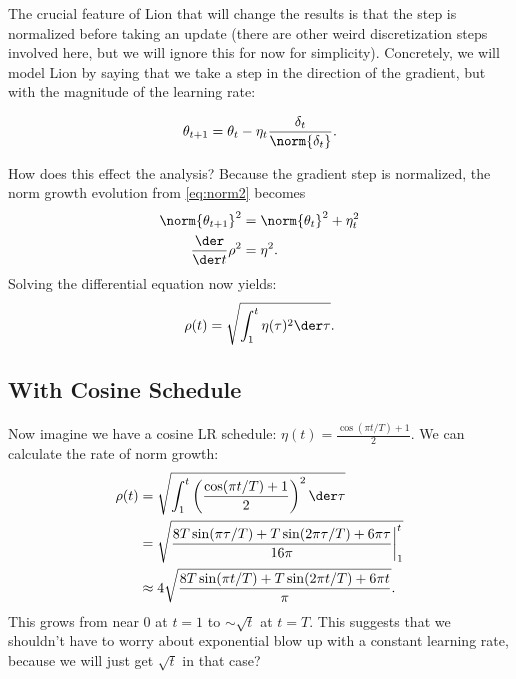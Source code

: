 \documentclass{article}
\newcommand{\note}[4][]{\todo[author=#2,color=#3,size=\scriptsize,fancyline,caption={},#1]{#4}} %
\newcommand{\wm}[2][]{\note[#1]{Will M}{blue!40}{#2}}
\begin{document}

The crucial feature of Lion that will change the results is that the step is normalized before taking an update (there are other weird discretization steps involved here, but we will ignore this for now for simplicity). Concretely, we will model Lion by saying that we take a step in the direction of the gradient, but with the magnitude of the learning rate:

\begin{equation*}
    \theta_{t+1} = \theta_t - \eta_t \frac{\delta_t}{\norm{\delta_t}} .
\end{equation*}

How does this effect the analysis? Because the gradient step is normalized, the norm growth evolution from \eqref{eq:norm2} becomes
\begin{align*}
    \norm{\theta_{t+1}}^2 &= \norm{\theta_t}^2 + \eta_t^2 \\
    \frac{\der}{\der t} \rho^2 &= \eta^2 .
\end{align*}
Solving the differential equation now yields:
\begin{equation*}
    \rho(t) = \sqrt{\int_1^t \eta(\tau)^2 \der \tau} .
\end{equation*}

\subsection{With Cosine Schedule}

Now imagine we have a cosine LR schedule: $\eta(t) = \frac{\cos(\pi t/T) + 1}{2}$.\wm{Do I have this right?} We can calculate the rate of norm growth:
\begin{align*}
    \rho(t) 
    &= \sqrt{\int_1^t \left( \frac{\cos(\pi t/T) + 1}{2} \right)^2 \der \tau} \\
    &= \sqrt{\frac{8T\sin(\pi \tau/T) + T \sin(2\pi \tau/T) + 6\pi \tau}{16\pi} \bigg \rvert^t_1} \\
    &\approx 4 \sqrt{\frac{8 T \sin(\pi t/T) + T \sin(2 \pi t/T) + 6 \pi t}{\pi}} .
\end{align*}
This grows from near $0$ at $t=1$ to $\sim \sqrt{t}$ at $t=T$.
This suggests that we shouldn't have to worry about exponential blow up with a constant learning rate, because we will just get $\sqrt{t}$ in that case?
\end{document}
